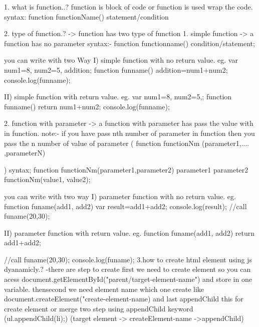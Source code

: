 1. what is function..?
 function is block of code or function is used wrap the code.
 syntax: 
      function functionName(){
                                      statement/condition
                                }
                                
2. type of function.?
-> function has two type of function 
            1. simple function      
            -> a function has no parameter
                  syntax:- function functionname(){
                        condition/statement;
                  }

                  you can write with two Way
                        I) simple function with no return value.
                        eg.
                        var num1=8, num2=5, addition;
                        function funname(){
                              addition=num1+num2;
                        }
                        console.log(funname);

                        II) simple function with return value.
                        eg. 
                        var num1=8, num2=5,;
                        function funname(){
                              return num1+num2;
                        }
                        console.log(funname);

            2. function with parameter
            -> a function with parameter has pass the value with  in function.
            note:- if you have pass nth number of  parameter in function then you pass the n number of value of parameter
                        ( function functionNm (parameter1,.... ,parameterN){

                        }
                        

                        )
            syntax;
            function functionNm(parameter1,parameter2)
            {
                  parameter1
                  parameter2
            } 
            functionNm(value1, value2);

            you can write with two way
            I) parameter function with no return value.
            eg. function funame(add1, add2){
                  var result=add1+add2;   
                  console.log(result);
            }
            //call
            funame(20,30);

            II) parameter function with return value.
            eg.
            function funame(add1, add2){
                  return add1+add2;
            }
            
            //call
            funame(20,30);
            console.log(funame);
3.how to create html element using js dyanamicly.?
-there are step to create 
      first we need to create element so you can acess document.getElementById("parent/target-element-name") and store in one variable.
      thensecond we need element name which one create like document.createElement("create-element-name)
      and last appendChild this for create element or merge two step using appendChild keyword (ul.appendChild(li);)
      (target element -> createElement-name ->appendChild)
      
